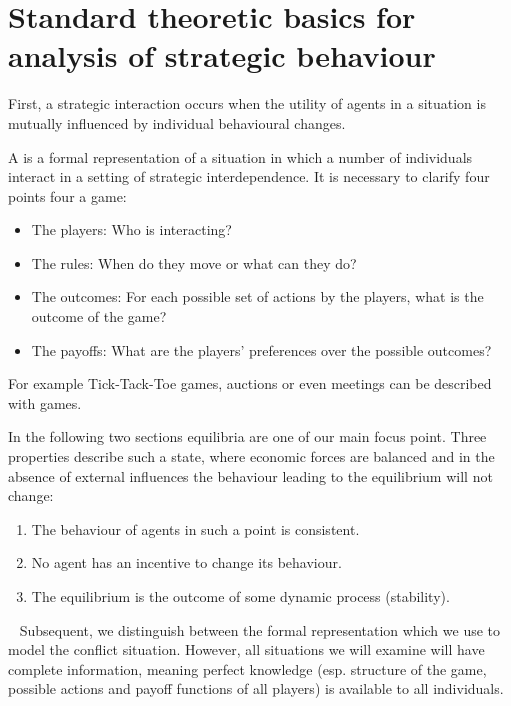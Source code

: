 

\chapter{Standard theoretic basics for analysis of strategic behaviour}

First, a strategic interaction occurs when the utility of agents in a situation is mutually influenced by individual behavioural changes. 

A  is a formal representation of a situation in which a number of individuals interact in a setting of strategic interdependence.
	It is necessary to clarify four points four a game:
	\begin{itemize}
		\item The players: Who is interacting?
		\item The rules: When do they move or what can they do?
		\item The outcomes: For each possible set of actions by the players, what is the outcome of the game?
		\item The payoffs: What are the players' preferences over the possible outcomes?
	\end{itemize}

For example Tick-Tack-Toe games, auctions or even meetings can be described with games. 

In the following two sections equilibria are one of our main focus point. Three properties describe such a state, where economic forces are balanced and in the absence of external influences the behaviour leading to the equilibrium will not change:
\begin{enumerate}
	\item The behaviour of agents in such a point is consistent.
	\item No agent has an incentive to change its behaviour.
	\item The equilibrium is the outcome of some dynamic process (stability).
\end{enumerate}

~\newline
Subsequent, we distinguish between the formal representation which we use to model the conflict situation. However, all situations we will examine will have complete information, meaning perfect knowledge (esp. structure of the game, possible actions and payoff functions of all players) is available to all individuals. 


\newpage